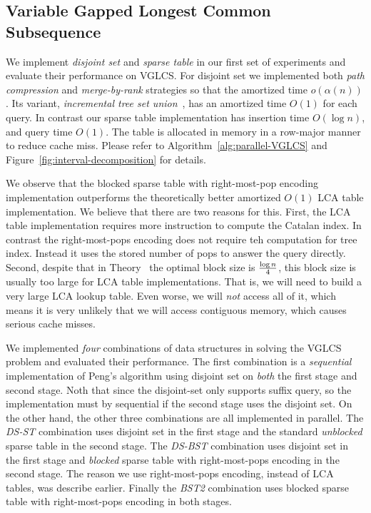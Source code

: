 \subsection{Variable Gapped Longest Common Subsequence}

We implement {\em disjoint set} and {\em sparse table} in our first
set of experiments and evaluate their performance on VGLCS.  For
disjoint set we implemented both {\em path compression} and {\em
  merge-by-rank} strategies so that the amortized time $o(\alpha(n))$.
Its variant, {\em incremental tree set union}~\cite{Gabow1983ALA}, has
an amortized time $O(1)$ for each query.  In contrast our sparse table
implementation has insertion time $O(\log n)$, and query time $O(1)$.
The table is allocated in memory in a row-major manner to reduce cache
miss.  Please refer to Algorithm~\ref{alg:parallel-VGLCS} and
Figure~\ref{fig:interval-decomposition} for details.

We observe that the blocked sparse table with right-most-pop encoding
implementation outperforms the theoretically better amortized $O(1)$
LCA table implementation.  We believe that there are two reasons for
this.  First, the LCA table implementation requires more instruction
to compute the Catalan index.  In contrast the right-most-pops
encoding does not require teh computation for tree index.  Instead it
uses the stored number of pops to answer the query directly.  Second,
despite that in Theory~\cite{Fischer2006TheoreticalAP} the optimal
block size is ${\log n}\over{4}$, this block size is usually too large
for LCA table implementations.  That is, we will need to build a very
large LCA lookup table.  Even worse, we will {\em not} access all of
it, which means it is very unlikely that we will access contiguous
memory, which causes serious cache misses.

We implemented {\em four} combinations of data structures in solving
the VGLCS problem and evaluated their performance.  The first
combination is a {\em sequential} implementation of Peng's algorithm
using disjoint set on {\em both} the first stage and second stage.
Noth that since the disjoint-set only supports suffix query, so the
implementation must by sequential if the second stage uses the
disjoint set.  On the other hand, the other three combinations are all
implemented in parallel.  The {\em DS-ST} combination uses disjoint
set in the first stage and the standard {\em unblocked} sparse table
in the second stage.  The {\em DS-BST} combination uses disjoint set
in the first stage and {\em blocked} sparse table with right-most-pops
encoding in the second stage.  The reason we use right-most-pops
encoding, instead of LCA tables, was describe earlier.  Finally the
{\em BST2} combination uses blocked sparse table with right-most-pops
encoding in both stages.

